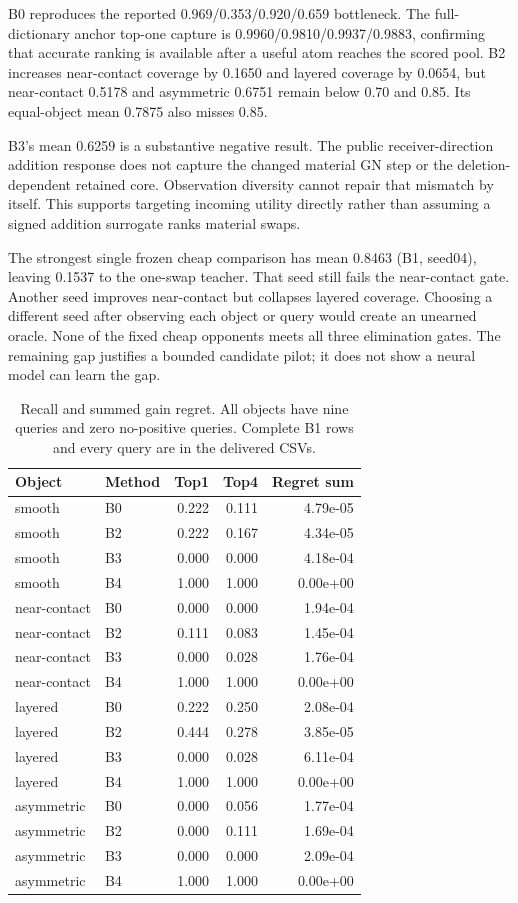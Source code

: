 \documentclass[11pt,a4paper]{article}
\begin{document}
B0 reproduces the reported 0.969/0.353/0.920/0.659 bottleneck. The full-dictionary anchor top-one capture is 0.9960/0.9810/0.9937/0.9883, confirming that accurate ranking is available after a useful atom reaches the scored pool. B2 increases near-contact coverage by 0.1650 and layered coverage by 0.0654, but near-contact 0.5178 and asymmetric 0.6751 remain below 0.70 and 0.85. Its equal-object mean 0.7875 also misses 0.85.

B3's mean 0.6259 is a substantive negative result. The public receiver-direction addition response does not capture the changed material GN step or the deletion-dependent retained core. Observation diversity cannot repair that mismatch by itself. This supports targeting incoming utility directly rather than assuming a signed addition surrogate ranks material swaps.

The strongest single frozen cheap comparison has mean 0.8463 (B1, seed04), leaving 0.1537 to the one-swap teacher. That seed still fails the near-contact gate. Another seed improves near-contact but collapses layered coverage. Choosing a different seed after observing each object or query would create an unearned oracle. None of the fixed cheap opponents meets all three elimination gates. The remaining gap justifies a bounded candidate pilot; it does not show a neural model can learn the gap.

\begin{table}[htbp]\centering\small
\caption{Recall and summed gain regret. All objects have nine queries and zero no-positive queries. Complete B1 rows and every query are in the delivered CSVs.}
\begin{tabular}{llrrr}\toprule Object & Method & Top1 & Top4 & Regret sum\\\midrule
smooth & B0 & 0.222 & 0.111 & 4.79e-05 \\
smooth & B2 & 0.222 & 0.167 & 4.34e-05 \\
smooth & B3 & 0.000 & 0.000 & 4.18e-04 \\
smooth & B4 & 1.000 & 1.000 & 0.00e+00 \\
near-contact & B0 & 0.000 & 0.000 & 1.94e-04 \\
near-contact & B2 & 0.111 & 0.083 & 1.45e-04 \\
near-contact & B3 & 0.000 & 0.028 & 1.76e-04 \\
near-contact & B4 & 1.000 & 1.000 & 0.00e+00 \\
layered & B0 & 0.222 & 0.250 & 2.08e-04 \\
layered & B2 & 0.444 & 0.278 & 3.85e-05 \\
layered & B3 & 0.000 & 0.028 & 6.11e-04 \\
layered & B4 & 1.000 & 1.000 & 0.00e+00 \\
asymmetric & B0 & 0.000 & 0.056 & 1.77e-04 \\
asymmetric & B2 & 0.000 & 0.111 & 1.69e-04 \\
asymmetric & B3 & 0.000 & 0.000 & 2.09e-04 \\
asymmetric & B4 & 1.000 & 1.000 & 0.00e+00 \\
\bottomrule\end{tabular}\end{table}
\end{document}
